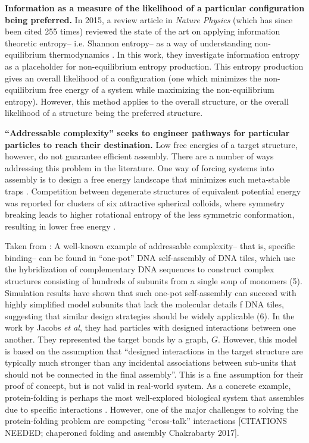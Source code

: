\textbf{Information as a measure of the likelihood of a particular configuration being preferred.}
In 2015, a review article in \textit{Nature Physics} (which has since been cited 255 times) reviewed the state of the art on applying information theoretic entropy-- i.e. Shannon entropy-- as a way of understanding non-equilibrium thermodynamics \cite{Parrondo_2015_NaturePhysics}.
In this work, they investigate information entropy as a placeholder for non-equilibrium entropy production.
This entropy production gives an overall likelihood of a configuration (one which minimizes the non-equilibrium free energy of a system while maximizing the non-equilibrium entropy).
However, this method applies to the overall structure, or the overall likelihood of a structure being the preferred structure.

\textbf{``Addressable complexity'' seeks to engineer pathways for particular particles to reach their destination.}
Low free energies of a target structure, however, do not guarantee efficient assembly.
There are a number of ways addressing this problem in the literature.
One way of forcing systems into assembly is to design a free energy landscape that minimizes such meta-stable traps \cite{Wales_2017_JChemPhys}.
Competition between degenerate structures of equivalent potential energy was reported for clusters of six attractive spherical colloids, where symmetry breaking leads to higher rotational entropy of the less symmetric conformation, resulting in lower free energy \cite{Meng_2010_Science}.

Taken from \cite{Jacobs_2015_JChemPhys}: 
A well-known example of addressable complexity-- that is, specific binding-- can be found in ``one-pot'' DNA self-assembly of DNA tiles, which use the hybridization of complementary DNA sequences to construct complex structures consisting of hundreds of subunits from a single soup of monomers \cite{Ke_2012_Science} (5).
Simulation results have shown that such one-pot self-assembly can succeed with highly simplified model subunits that lack the molecular details f DNA tiles, suggesting that similar design strategies should be widely applicable \cite{Reinhardt_2014_PRL} (6).
In the work by Jacobs \textit{et al}, they had particles with designed interactions between one another.
They represented the target bonds by a graph, $G$.
However, this model is based on the assumption that ``designed interactions in the target structure are typically much stronger than any incidental associations between sub-units that should not be connected in the final assembly''.
This is a fine assumption for their proof of concept, but is not valid in real-world system.
As a concrete example, protein-folding is perhaps the most well-explored biological system that assembles due to specific interactions \cite{Dill_1993_CurrOpinStructBiol}.
However, one of the major challenges to solving the protein-folding problem are competing ``cross-talk'' interactions [CITATIONS NEEDED; chaperoned folding and assembly Chakrabarty 2017].

